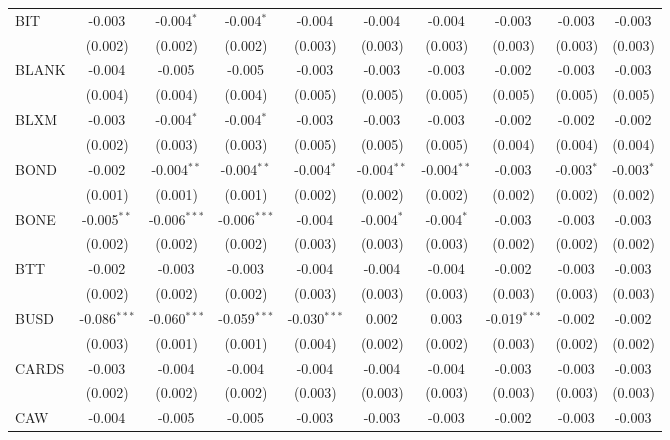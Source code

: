 \begin{table}[!htbp]
\begin{tabular}{@{\extracolsep{5pt}}lccccccccc}
 BIT & -0.003$^{}$ & -0.004$^{*}$ & -0.004$^{*}$ & -0.004$^{}$ & -0.004$^{}$ & -0.004$^{}$ & -0.003$^{}$ & -0.003$^{}$ & -0.003$^{}$ \\
  & (0.002) & (0.002) & (0.002) & (0.003) & (0.003) & (0.003) & (0.003) & (0.003) & (0.003) \\
 BLANK & -0.004$^{}$ & -0.005$^{}$ & -0.005$^{}$ & -0.003$^{}$ & -0.003$^{}$ & -0.003$^{}$ & -0.002$^{}$ & -0.003$^{}$ & -0.003$^{}$ \\
  & (0.004) & (0.004) & (0.004) & (0.005) & (0.005) & (0.005) & (0.005) & (0.005) & (0.005) \\
 BLXM & -0.003$^{}$ & -0.004$^{*}$ & -0.004$^{*}$ & -0.003$^{}$ & -0.003$^{}$ & -0.003$^{}$ & -0.002$^{}$ & -0.002$^{}$ & -0.002$^{}$ \\
  & (0.002) & (0.003) & (0.003) & (0.005) & (0.005) & (0.005) & (0.004) & (0.004) & (0.004) \\
 BOND & -0.002$^{}$ & -0.004$^{**}$ & -0.004$^{**}$ & -0.004$^{*}$ & -0.004$^{**}$ & -0.004$^{**}$ & -0.003$^{}$ & -0.003$^{*}$ & -0.003$^{*}$ \\
  & (0.001) & (0.001) & (0.001) & (0.002) & (0.002) & (0.002) & (0.002) & (0.002) & (0.002) \\
 BONE & -0.005$^{**}$ & -0.006$^{***}$ & -0.006$^{***}$ & -0.004$^{}$ & -0.004$^{*}$ & -0.004$^{*}$ & -0.003$^{}$ & -0.003$^{}$ & -0.003$^{}$ \\
  & (0.002) & (0.002) & (0.002) & (0.003) & (0.003) & (0.003) & (0.002) & (0.002) & (0.002) \\
 BTT & -0.002$^{}$ & -0.003$^{}$ & -0.003$^{}$ & -0.004$^{}$ & -0.004$^{}$ & -0.004$^{}$ & -0.002$^{}$ & -0.003$^{}$ & -0.003$^{}$ \\
  & (0.002) & (0.002) & (0.002) & (0.003) & (0.003) & (0.003) & (0.003) & (0.003) & (0.003) \\
 BUSD & -0.086$^{***}$ & -0.060$^{***}$ & -0.059$^{***}$ & -0.030$^{***}$ & 0.002$^{}$ & 0.003$^{}$ & -0.019$^{***}$ & -0.002$^{}$ & -0.002$^{}$ \\
  & (0.003) & (0.001) & (0.001) & (0.004) & (0.002) & (0.002) & (0.003) & (0.002) & (0.002) \\
 CARDS & -0.003$^{}$ & -0.004$^{}$ & -0.004$^{}$ & -0.004$^{}$ & -0.004$^{}$ & -0.004$^{}$ & -0.003$^{}$ & -0.003$^{}$ & -0.003$^{}$ \\
  & (0.002) & (0.002) & (0.002) & (0.003) & (0.003) & (0.003) & (0.003) & (0.003) & (0.003) \\
 CAW & -0.004$^{}$ & -0.005$^{}$ & -0.005$^{}$ & -0.003$^{}$ & -0.003$^{}$ & -0.003$^{}$ & -0.002$^{}$ & -0.003$^{}$ & -0.003$^{}$ \\

\end{tabular}
\end{table}
